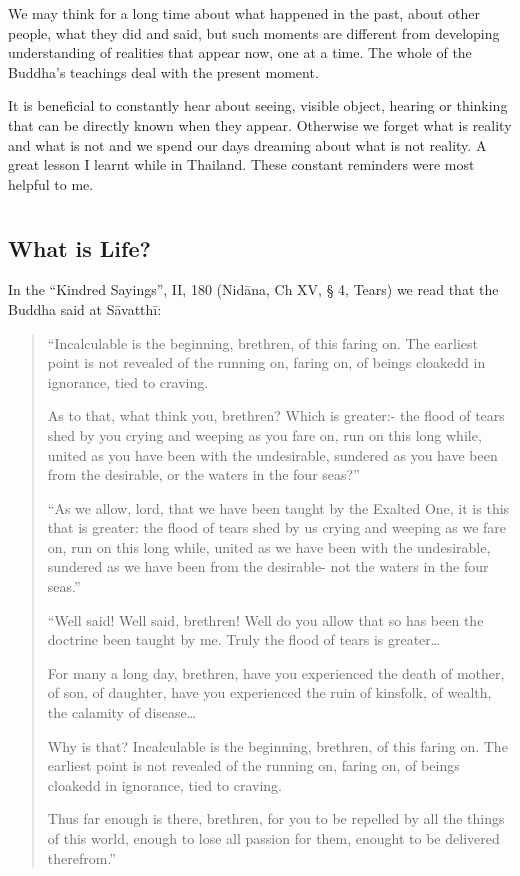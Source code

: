 We may think for a long time about what happened in the past, about
other people, what they did and said, but such moments are different
from developing understanding of realities that appear now, one at a
time. The whole of the Buddha's teachings deal with the present moment.

It is beneficial to constantly hear about seeing, visible object,
hearing or thinking that can be directly known when they appear.
Otherwise we forget what is reality and what is not and we spend our
days dreaming about what is not reality. A great lesson I learnt while
in Thailand. These constant reminders were most helpful to me.



\chapter[What is Life?]{}
\section*{What is Life?}

In the ``Kindred Sayings'', II, 180 (Nidāna, Ch XV, § 4, Tears) we read
that the Buddha said at Sāvatthī:

\begin{quote}

``Incalculable is the beginning, brethren, of this faring on. The
earliest point is not revealed of the running on, faring on, of beings
cloakedd in ignorance, tied to craving.

As to that, what think you, brethren? Which is greater:- the flood of
tears shed by you crying and weeping as you fare on, run on this long
while, united as you have been with the undesirable, sundered as you
have been from the desirable, or the waters in the four seas?''

``As we allow, lord, that we have been taught by the Exalted One, it is
this that is greater: the flood of tears shed by us crying and weeping
as we fare on, run on this long while, united as we have been with the
undesirable, sundered as we have been from the desirable- not the waters
in the four seas.''

``Well said! Well said, brethren! Well do you allow that so has been the
doctrine been taught by me. Truly the flood of tears is greater\ldots{}

For many a long day, brethren, have you experienced the death of mother,
of son, of daughter, have you experienced the ruin of kinsfolk, of
wealth, the calamity of disease\ldots{}

Why is that? Incalculable is the beginning, brethren, of this faring on.
The earliest point is not revealed of the running on, faring on, of
beings cloakedd in ignorance, tied to craving.

Thus far enough is there, brethren, for you to be repelled by all the
things of this world, enough to lose all passion for them, enought to be
delivered therefrom.''

\end{quote}

